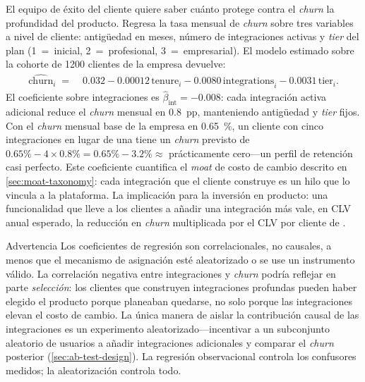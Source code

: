 \begin{example}
El equipo de éxito del cliente quiere saber cuánto protege contra el \emph{churn} la
profundidad del producto. Regresa la tasa mensual de \emph{churn} sobre tres variables a
nivel de cliente: antigüedad en meses, número de integraciones activas y \emph{tier} del
plan (1~=~inicial, 2~=~profesional, 3~=~empresarial). El modelo estimado sobre la cohorte
de \num{1200} clientes de la empresa devuelve:
\begin{align*}
  \widehat{\text{churn}}_i \;=\;{}
    & 0.032
      - 0.00012\,\text{tenure}_i
      - 0.0080\,\text{integrations}_i
      - 0.0031\,\text{tier}_i.
\end{align*}
El coeficiente sobre integraciones es \(\hat{\beta}_{\text{int}} = -0.008\): cada integración
activa adicional reduce el \emph{churn} mensual en \qty{0.8}{pp}, manteniendo antigüedad y
\emph{tier} fijos. Con el \emph{churn} mensual base de la empresa en \qty{0.65}{\percent},
un cliente con cinco integraciones en lugar de una tiene un \emph{churn} previsto de
\(0.65\% - 4\times0.8\% = 0.65\% - 3.2\% \approx \) prácticamente cero---un perfil de
retención casi perfecto. Este coeficiente cuantifica el \emph{moat} de costo de cambio
descrito en \cref{sec:moat-taxonomy}: cada integración que el cliente construye es un hilo
que lo vincula a la plataforma. La implicación para la inversión en producto: una
funcionalidad que lleve a los clientes a añadir una integración más vale, en CLV anual
esperado, la reducción en \emph{churn} multiplicada por el CLV por cliente de .
\end{example}

\begin{admonition}{Advertencia}
Los coeficientes de regresión son correlacionales, no causales, a menos que el mecanismo de
asignación esté aleatorizado o se use un instrumento válido. La correlación negativa entre
integraciones y \emph{churn} podría reflejar en parte \emph{selección}: los clientes que
construyen integraciones profundas pueden haber elegido el producto porque planeaban quedarse,
no solo porque las integraciones elevan el costo de cambio. La única manera de aislar la
contribución causal de las integraciones es un experimento aleatorizado---incentivar a un
subconjunto aleatorio de usuarios a añadir integraciones adicionales y comparar el
\emph{churn} posterior (\cref{sec:ab-test-design}). La regresión observacional controla los
confusores medidos; la aleatorización controla todo.
\end{admonition}

